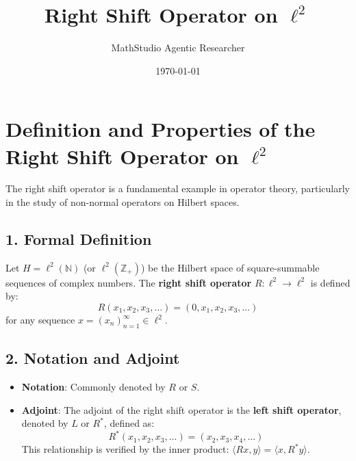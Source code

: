 \documentclass{article}
\title{Right Shift Operator on $\ell^2$}
\author{MathStudio Agentic Researcher}
\date{\today}
\begin{document}
\maketitle
\section*{Definition and Properties of the Right Shift Operator on $\ell^2$}

The right shift operator is a fundamental example in operator theory, particularly in the study of non-normal operators on Hilbert spaces.

\subsection*{1. Formal Definition}
Let $H = \ell^2(\mathbb{N})$ (or $\ell^2(\mathbb{Z}_+)$) be the Hilbert space of square-summable sequences of complex numbers. The \textbf{right shift operator} $R: \ell^2 \to \ell^2$ is defined by:
\[ R(x_1, x_2, x_3, \dots) = (0, x_1, x_2, x_3, \dots) \]
for any sequence $x = (x_n)_{n=1}^\infty \in \ell^2$.

\subsection*{2. Notation and Adjoint}
\begin{itemize}
    \item \textbf{Notation}: Commonly denoted by $R$ or $S$.
    \item \textbf{Adjoint}: The adjoint of the right shift operator is the \textbf{left shift operator}, denoted by $L$ or $R^*$, defined as:
    \[ R^*(x_1, x_2, x_3, \dots) = (x_2, x_3, x_4, \dots) \]
    This relationship is verified by the inner product: $\langle Rx, y \rangle = \langle x, R^*y \rangle$.
\end{itemize}
\end{document}
